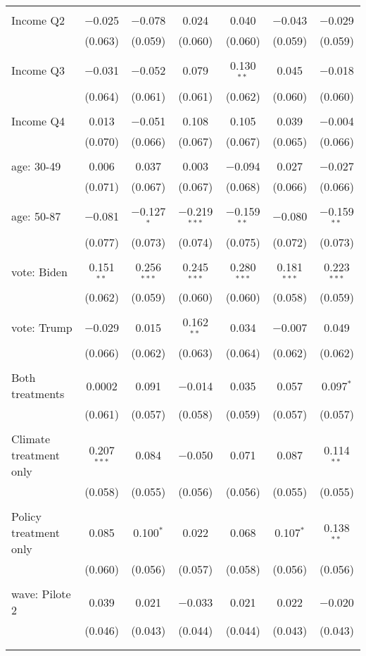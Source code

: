 \begin{tabular}{@{\extracolsep{5pt}}lcccccc}
  & & & & & & \\ 
 Income Q2 & $-$0.025 & $-$0.078 & 0.024 & 0.040 & $-$0.043 & $-$0.029 \\ 
  & (0.063) & (0.059) & (0.060) & (0.060) & (0.059) & (0.059) \\ 
  & & & & & & \\ 
 Income Q3 & $-$0.031 & $-$0.052 & 0.079 & 0.130$^{**}$ & 0.045 & $-$0.018 \\ 
  & (0.064) & (0.061) & (0.061) & (0.062) & (0.060) & (0.060) \\ 
  & & & & & & \\ 
 Income Q4 & 0.013 & $-$0.051 & 0.108 & 0.105 & 0.039 & $-$0.004 \\ 
  & (0.070) & (0.066) & (0.067) & (0.067) & (0.065) & (0.066) \\ 
  & & & & & & \\ 
 age: 30-49 & 0.006 & 0.037 & 0.003 & $-$0.094 & 0.027 & $-$0.027 \\ 
  & (0.071) & (0.067) & (0.067) & (0.068) & (0.066) & (0.066) \\ 
  & & & & & & \\ 
 age: 50-87 & $-$0.081 & $-$0.127$^{*}$ & $-$0.219$^{***}$ & $-$0.159$^{**}$ & $-$0.080 & $-$0.159$^{**}$ \\ 
  & (0.077) & (0.073) & (0.074) & (0.075) & (0.072) & (0.073) \\ 
  & & & & & & \\ 
 vote: Biden & 0.151$^{**}$ & 0.256$^{***}$ & 0.245$^{***}$ & 0.280$^{***}$ & 0.181$^{***}$ & 0.223$^{***}$ \\ 
  & (0.062) & (0.059) & (0.060) & (0.060) & (0.058) & (0.059) \\ 
  & & & & & & \\ 
 vote: Trump & $-$0.029 & 0.015 & 0.162$^{**}$ & 0.034 & $-$0.007 & 0.049 \\ 
  & (0.066) & (0.062) & (0.063) & (0.064) & (0.062) & (0.062) \\ 
  & & & & & & \\ 
 Both treatments & 0.0002 & 0.091 & $-$0.014 & 0.035 & 0.057 & 0.097$^{*}$ \\ 
  & (0.061) & (0.057) & (0.058) & (0.059) & (0.057) & (0.057) \\ 
  & & & & & & \\ 
 Climate treatment only & 0.207$^{***}$ & 0.084 & $-$0.050 & 0.071 & 0.087 & 0.114$^{**}$ \\ 
  & (0.058) & (0.055) & (0.056) & (0.056) & (0.055) & (0.055) \\ 
  & & & & & & \\ 
 Policy treatment only & 0.085 & 0.100$^{*}$ & 0.022 & 0.068 & 0.107$^{*}$ & 0.138$^{**}$ \\ 
  & (0.060) & (0.056) & (0.057) & (0.058) & (0.056) & (0.056) \\ 
  & & & & & & \\ 
 wave: Pilote 2 & 0.039 & 0.021 & $-$0.033 & 0.021 & 0.022 & $-$0.020 \\ 
  & (0.046) & (0.043) & (0.044) & (0.044) & (0.043) & (0.043) \\ 
  & & & & & & \\ 
\hline \\[-1.8ex] 


\end{tabular}
